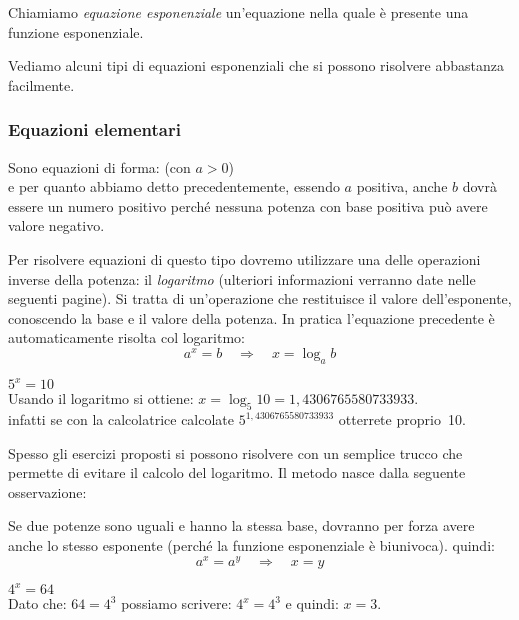 
\begin{definizione}
Chiamiamo \emph{equazione esponenziale} un'equazione nella quale 
è presente una funzione esponenziale.
\end{definizione}

Vediamo alcuni tipi di equazioni esponenziali che si possono risolvere 
abbastanza facilmente.

\subsubsection{Equazioni elementari}
\label{subsubsec:esplog_eq_elementari}

Sono equazioni di forma:  \;\;  \quad (con \(a>0\))\\[4pt]
e per quanto abbiamo detto precedentemente, essendo \(a\) positiva, anche 
\(b\) dovrà essere un numero positivo perché nessuna potenza con base 
positiva può avere valore negativo.

Per risolvere equazioni di questo tipo dovremo utilizzare una delle 
operazioni inverse della potenza: il \emph{logaritmo} (ulteriori 
informazioni verranno date nelle seguenti pagine). 
Si tratta di un'operazione che restituisce il valore dell'esponente, 
conoscendo la base e il valore della potenza. 
In pratica l'equazione precedente è automaticamente risolta col logaritmo:
\[ a^x=b \quad \Longrightarrow \quad x = \log_a b\]

\begin{esempio} \(5^x=10\)\\[4pt]
Usando il logaritmo si ottiene: \(x=\log_5 10 = 1,4306765580733933\).\\[2pt]
infatti se con la calcolatrice calcolate \(5^{1,4306765580733933}\) 
otterrete proprio~10.
\end{esempio}

Spesso gli esercizi proposti si possono risolvere con un semplice trucco 
che permette di evitare il calcolo del logaritmo. Il metodo nasce dalla 
seguente osservazione:

\begin{osservazione}
 Se due potenze sono uguali e hanno la stessa base, dovranno per 
forza avere anche lo stesso esponente (perché la funzione esponenziale è 
biunivoca). quindi: 
\[ a^x = a^y \quad \Longrightarrow \quad x=y\]
\end{osservazione}
\begin{esempio}
\(4^x=64\) \\[4pt]Dato che: \(64=4^3\) possiamo scrivere: \(4^x=4^3\) 
e quindi: \(x=3\).
\end{esempio}

